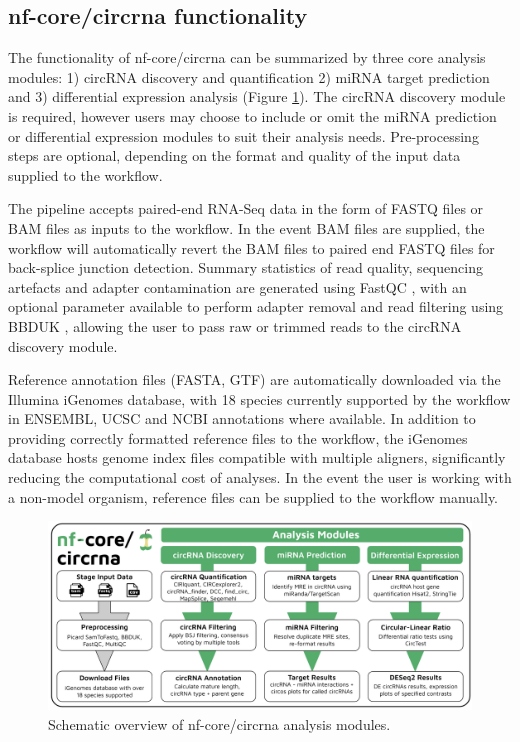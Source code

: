 \documentclass{bmcart}
\begin{document}
\subsection*{\textbf{nf-core/circrna functionality}}
The functionality of nf-core/circrna can be summarized by three core analysis modules: 1) circRNA discovery and quantification 2) miRNA target prediction and 3) differential expression analysis (Figure \ref{fig:1}). The circRNA discovery module is required, however users may choose to include or omit the miRNA prediction or differential expression modules to suit their analysis needs. Pre-processing steps are optional, depending on the format and quality of the input data supplied to the workflow.
\par
The pipeline accepts paired-end RNA-Seq data in the form of FASTQ files or BAM files as inputs to the workflow. In the event BAM files are supplied, the workflow will automatically revert the BAM files to paired end FASTQ files for back-splice junction detection. Summary statistics of read quality, sequencing artefacts and adapter contamination are generated using FastQC \cite{fastqc}, with an optional parameter available to perform adapter removal and read filtering using BBDUK \cite{bbduk}, allowing the user to pass raw or trimmed reads to the circRNA discovery module. 
\par
Reference annotation files (FASTA, GTF) are automatically downloaded via the Illumina iGenomes database, with 18 species currently supported by the workflow in ENSEMBL, UCSC and NCBI annotations where available. In addition to providing correctly formatted reference files to the workflow, the iGenomes database hosts genome index files compatible with multiple aligners, significantly reducing the computational cost of analyses. In the event the user is working with a non-model organism, reference files can be supplied to the workflow manually.

\begin{figure}[h!]
    \includegraphics[width=12.25cm]{figure1.png}
    \vspace{-5mm}
    \caption{Schematic overview of nf-core/circrna analysis modules.}
    \label{fig:1}
\end{figure}
\end{document}
